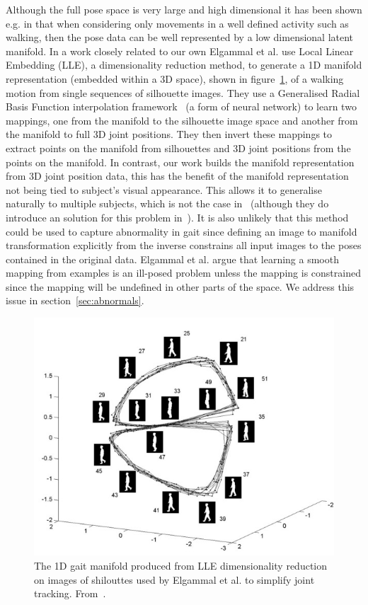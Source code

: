 \documentclass[11pt]{article} %
\begin{document}
Although the full pose space is very large and high dimensional it has been shown e.g. in \cite{Brand1999,Elgammal2004} that when considering only movements in a well defined activity such as walking, then the pose data can be well represented by a low dimensional latent manifold. In a work closely related to our own Elgammal et al. \cite{Elgammal2004} use Local Linear Embedding (LLE), a dimensionality reduction method, to generate a 1D manifold representation (embedded within a 3D space), shown in figure~\ref{fig:elg}, of a walking motion from single sequences of silhouette images. They use a Generalised Radial Basis Function interpolation framework~\cite{Poggio1990} (a form of neural network) to learn two mappings, one from the manifold to the silhouette image space and another from the manifold to full 3D joint positions. They then invert these mappings to extract points on the manifold from silhouettes and 3D joint positions from the points on the manifold. In contrast, our work builds the manifold representation from 3D joint position data, this has the benefit of the manifold representation not being tied to subject's visual appearance. This allows it to generalise naturally to multiple subjects, which is not the case in~\cite{Elgammal2004} (although they do introduce an solution for this problem in~\cite{Elgammal2004b}). It is also unlikely that this method could be used to capture abnormality in gait since defining an image to manifold transformation explicitly from the inverse constrains all input images to the poses contained in the original data. Elgammal et al. argue that learning a smooth mapping from examples is an ill-posed problem unless the mapping is constrained since the mapping will be undefined in other parts of the space. We address this issue in section~\ref{sec:abnormals}.
\begin{figure}
\centering
\includegraphics*[width=0.6\linewidth,clip]{elgamel}
\caption{ The 1D gait manifold produced from LLE dimensionality reduction on images of shilouttes used by Elgammal et al. to simplify joint tracking. From~\cite{Elgammal2004}. \label{fig:elg}  } 
\end{figure}
\end{document}
